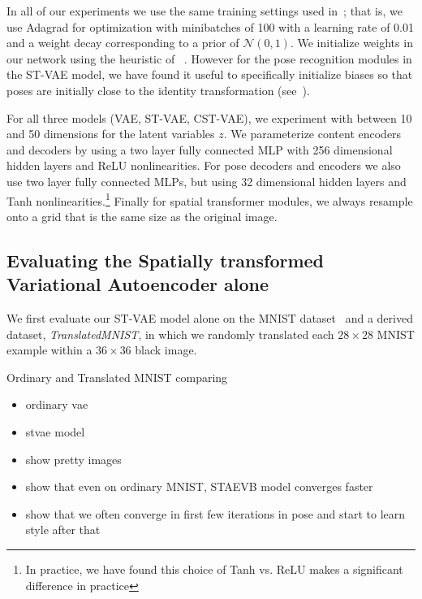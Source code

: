 
In all of our experiments we use the same training settings used in~\cite{Kingma2014}; that is,  
we use Adagrad for optimization with minibatches of 100  with a learning rate of 0.01
and a weight decay corresponding to a prior of $\mathcal{N}(0,1)$.
We initialize weights in our network using the heuristic of ~\cite{glorot2010understanding}.
However for the pose recognition modules in the ST-VAE model, we have found it useful to
specifically initialize biases so that poses are initially close to the identity transformation (see~\cite{jaderberg2015spatial}).

For all three models (VAE, ST-VAE, CST-VAE),
we experiment with between 10 and 50  dimensions for the latent variables $z$.
We parameterize content encoders and decoders
by using a two layer fully connected MLP with 256 dimensional
hidden layers and ReLU nonlinearities.
For pose decoders and encoders we also use two layer fully connected MLPs, but 
using 32 dimensional hidden layers and Tanh nonlinearities.\footnote{
In practice, we have found this choice of Tanh vs. ReLU makes a significant difference in practice}
Finally for spatial transformer modules, we always resample onto a grid that is the same size as the original
image.

\subsection{Evaluating the Spatially transformed Variational Autoencoder alone}

We first evaluate our ST-VAE model alone on the MNIST dataset~\citep{lecun1998gradient}
and a derived dataset, \emph{TranslatedMNIST}, in which we randomly translated each  $28\times 28$ MNIST example
within a $36\times 36$ black image.




Ordinary and Translated MNIST comparing
\begin{itemize}
\item ordinary vae
\item stvae model
\end{itemize}


\begin{itemize}
\item show pretty images
\item show that even on ordinary MNIST, STAEVB model converges faster
\item show that we often converge in first few iterations in pose and start to learn style after that
\end{itemize}



